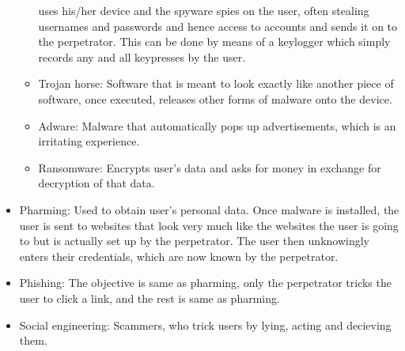 \documentclass{article}
\begin{document}
\begin{itemize}
\begin{itemize}
				uses his/her device and the spyware spies on the user, often stealing
				usernames and passwords and hence access to accounts and sends it on
				to the perpetrator. This can be done by means of a keylogger which 
				simply records any and all keypresses by the user.
			\item Trojan horse: Software that is meant to look exactly like another
				piece of software, once executed, releases other forms of malware onto
				the device.
			\item Adware: Malware that automatically pops up advertisements, which is
				an irritating experience.
			\item Ransomware: Encrypts user's data and asks for money in exchange for
				decryption of that data.
		\end{itemize}
	\item Pharming: Used to obtain user's personal data. Once malware is installed,
		the user is sent to websites that look very much like the websites the user is
		going to but is actually set up by the perpetrator. The user then unknowingly
		enters their credentials, which are now known by the perpetrator.
	\item Phishing: The objective is same as pharming, only the perpetrator tricks the
		user to click a link, and the rest is same as pharming.
	\item Social engineering: Scammers, who trick users by lying, acting and decieving
		them.
\end{itemize}
\end{document}
